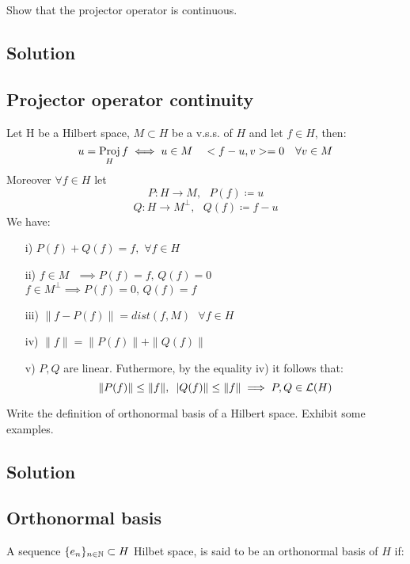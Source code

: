 \sheet


\question
Show that the projector operator is continuous.

\subsection*{Solution}

\subsection{Projector operator continuity}
Let H be a Hilbert space, $M \subset  H$ be a v.s.s. of $H$ and let $ f \in H$, then: 
\[ u = \operatorname*{Proj}_{H} f \iff u \in M \quad <f-u,v> = 0 \quad \forall v \in M \]
Moreover $\forall f \in H$ let 
\[ P: H \to M,\,\,\,\, P(f) \coloneqq u \]
\[ Q: H \to M^{\perp},\,\,\,\, Q(f) \coloneqq f-u \]
We have:

\begin{itemize}
    \item[i)] $P(f) + Q(f) = f, \,\, \forall f \in H$
    \item[ii)] $f \in M \,\,\,\,\implies P(f) = f,\, Q(f) = 0$\\
    $f \in M^{\perp} \implies P(f) = 0,\, Q(f) = f$
    \item[iii)] $\|f-P(f)\| = dist(f,M) \,\,\,\,\forall f\in H$
    \item[iv)] $\|f\| = \|P(f)\|+\|Q(f)\|$
    \item[v)] $P,Q$ are linear. Futhermore, by the equality iv) it follows that: 
\[ \|P(f)\| \leq \|f\|, \,\,\, |Q(f)\| \leq \|f\| \implies P,Q \in \mathcal{L}(H) \]
\end{itemize}


\question
Write the definition of orthonormal basis of a Hilbert space. Exhibit some examples.

\subsection*{Solution}

\subsection{Orthonormal basis}
A sequence $\{e_n\}_{n\in\mathbb{N}} \subset H$ Hilbet space, is said to be an orthonormal basis of $H$ if:\\

